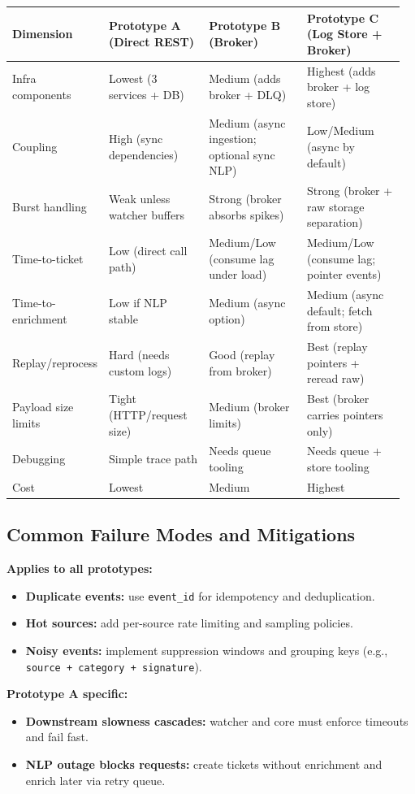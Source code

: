 \begin{longtable}{@{}p{0.18\linewidth}p{0.26\linewidth}p{0.26\linewidth}p{0.26\linewidth}@{}}
\toprule
\textbf{Dimension} & \textbf{Prototype A (Direct REST)} & \textbf{Prototype B (Broker)} & \textbf{Prototype C (Log Store + Broker)} \\
\midrule
Infra components & Lowest (3 services + DB) & Medium (adds broker + DLQ) & Highest (adds broker + log store) \\
Coupling & High (sync dependencies) & Medium (async ingestion; optional sync NLP) & Low/Medium (async by default) \\
Burst handling & Weak unless watcher buffers & Strong (broker absorbs spikes) & Strong (broker + raw storage separation) \\
Time-to-ticket & Low (direct call path) & Medium/Low (consume lag under load) & Medium/Low (consume lag; pointer events) \\
Time-to-enrichment & Low if NLP stable & Medium (async option) & Medium (async default; fetch from store) \\
Replay/reprocess & Hard (needs custom logs) & Good (replay from broker) & Best (replay pointers + reread raw) \\
Payload size limits & Tight (HTTP/request size) & Medium (broker limits) & Best (broker carries pointers only) \\
Debugging & Simple trace path & Needs queue tooling & Needs queue + store tooling \\
Cost & Lowest & Medium & Highest \\
\bottomrule
\end{longtable}

\subsection{Common Failure Modes and Mitigations}
\textbf{Applies to all prototypes:}
\begin{itemize}
  \item \textbf{Duplicate events:} use \texttt{event\_id} for idempotency and deduplication.
  \item \textbf{Hot sources:} add per-source rate limiting and sampling policies.
  \item \textbf{Noisy events:} implement suppression windows and grouping keys (e.g., \texttt{source + category + signature}).
\end{itemize}

\textbf{Prototype A specific:}
\begin{itemize}
  \item \textbf{Downstream slowness cascades:} watcher and core must enforce timeouts and fail fast.
  \item \textbf{NLP outage blocks requests:} create tickets without enrichment and enrich later via retry queue.
\end{itemize}

